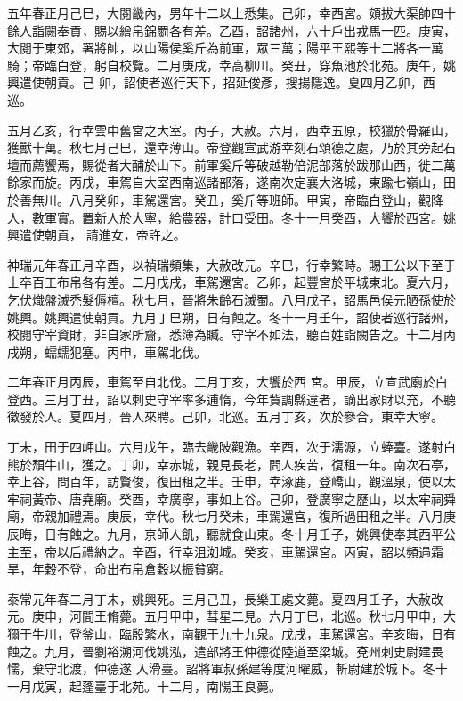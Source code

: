 \begin{pinyinscope}
 五年春正月己巳，大閱畿內，男年十二以上悉集。己卯，幸西宮。頞拔大渠帥四十餘人詣闕奉貢，賜以繒帛錦罽各有差。乙酉，詔諸州，六十戶出戎馬一匹。庚寅，大閱于東郊，署將帥，以山陽侯奚斤為前軍，眾三萬；陽平王熙等十二將各一萬騎；帝臨白登，躬自校覽。二月庚戌，幸高柳川。癸丑，穿魚池於北苑。庚午，姚興遣使朝貢。己
 卯，詔使者巡行天下，招延俊彥，搜揚隱逸。夏四月乙卯，西巡。



 五月乙亥，行幸雲中舊宮之大室。丙子，大赦。六月，西幸五原，校獵於骨羅山，獲獸十萬。秋七月己巳，還幸薄山。帝登觀宣武游幸刻石頌德之處，乃於其旁起石壇而薦饗焉，賜從者大酺於山下。前軍奚斤等破越勒倍泥部落於跋那山西，徙二萬餘家而旋。丙戌，車駕自大室西南巡諸部落，遂南次定襄大洛城，東踰七嶺山，田於善無川。八月癸卯，車駕還宮。癸丑，奚斤等班師。甲寅，帝臨白登山，觀降人，數軍實。置新人於大寧，給農器，計口受田。冬十一月癸酉，大饗於西宮。姚興遣使朝貢，
 請進女，帝許之。



 神瑞元年春正月辛酉，以禎瑞頻集，大赦改元。辛巳，行幸繁畤。賜王公以下至于士卒百工布帛各有差。二月戊戌，車駕還宮。乙卯，起豐宮於平城東北。夏六月，乞伏熾盤滅禿髮傉檀。秋七月，晉將朱齡石滅蜀。八月戊子，詔馬邑侯元陋孫使於姚興。姚興遣使朝貢。九月丁巳朔，日有蝕之。冬十一月壬午，詔使者巡行諸州，校閱守宰資財，非自家所齎，悉簿為贓。守宰不如法，聽百姓詣闕告之。十二月丙戌朔，蠕蠕犯塞。丙申，車駕北伐。



 二年春正月丙辰，車駕至自北伐。二月丁亥，大饗於西
 宮。甲辰，立宣武廟於白登西。三月丁丑，詔以刺史守宰率多逋惰，今年貲調縣違者，謫出家財以充，不聽徵發於人。夏四月，晉人來聘。己卯，北巡。五月丁亥，次於參合，東幸大寧。



 丁未，田于四岬山。六月戊午，臨去畿陂觀漁。辛酉，次于濡源，立蜯臺。遂射白熊於頹牛山，獲之。丁卯，幸赤城，親見長老，問人疾苦，復租一年。南次石亭，幸上谷，問百年，訪賢俊，復田租之半。壬申，幸涿鹿，登嶠山，觀溫泉，使以太牢祠黃帝、唐堯廟。癸酉，幸廣寧，事如上谷。己卯，登廣寧之歷山，以太牢祠舜廟，帝親加禮焉。庚辰，幸代。秋七月癸未，車駕還宮，復所過田租之半。八月庚
 辰晦，日有蝕之。九月，京師人飢，聽就食山東。冬十月壬子，姚興使奉其西平公主至，帝以后禮納之。辛酉，行幸沮洳城。癸亥，車駕還宮。丙寅，詔以頻遇霜旱，年穀不登，命出布帛倉穀以振貧窮。



 泰常元年春二月丁未，姚興死。三月己丑，長樂王處文薨。夏四月壬子，大赦改元。庚申，河間王脩薨。五月甲申，彗星二見。六月丁巳，北巡。秋七月甲申，大獮于牛川，登釜山，臨殷繁水，南觀于九十九泉。戊戌，車駕還宮。辛亥晦，日有蝕之。九月，晉劉裕溯河伐姚泓，遣部將王仲德從陸道至梁城。兗州刺史尉建畏懦，棄守北渡，仲德遂
 入滑臺。詔將軍叔孫建等度河曜威，斬尉建於城下。冬十一月戊寅，起蓬臺于北苑。十二月，南陽王良薨。




\end{pinyinscope}
